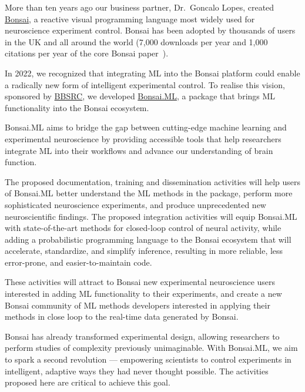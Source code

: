 More than ten years ago our business partner, Dr.~Goncalo Lopes, created
\href{https://bonsai-rx.org/}{Bonsai}, a reactive visual programming
language most widely used for neuroscience experiment control.
%
Bonsai has been adopted by thousands of users in the UK and all around the
world (7,000 downloads per year and 1,000 citations per year of the core Bonsai
paper~\citep{lopesEtAl15}).

In 2022, we recognized that integrating ML into the Bonsai platform could
enable a radically new form of intelligent experimental control.
%
To realise this vision, sponsored by
\href{https://gow.bbsrc.ukri.org/grants/AwardDetails.aspx?FundingReference=BB\%2FW019132\%2F1}{BBSRC},
we developed \href{https://bonsai-rx.org/machinelearning}{Bonsai.ML}, a package
that brings ML functionality into the Bonsai ecosystem.

Bonsai.ML aims to bridge the gap between cutting-edge machine learning and
experimental neuroscience by providing accessible tools that help researchers
integrate ML into their workflows and advance our understanding of brain
function.

The proposed documentation, training and dissemination activities will help
users of Bonsai.ML better understand the ML methods in the package, perform
more sophisticated neuroscience experiments, and produce unprecedented new
neuroscientific findings.
%
The proposed integration activities will equip Bonsai.ML with state-of-the-art
methods for closed-loop control of neural activity, while adding a
probabilistic programming language to the Bonsai ecosystem that will
accelerate, standardize, and simplify inference, resulting in more reliable,
less error-prone, and easier-to-maintain code.

These activities will attract to Bonsai new experimental neuroscience users
interested in adding ML functionality to their experiments, and create a new
Bonsai community of ML methods developers interested in applying their methods
in close loop to the real-time data generated by Bonsai.

Bonsai has already transformed experimental design, allowing researchers to
perform studies of complexity previously unimaginable. With Bonsai.ML, we aim
to spark a second revolution — empowering scientists to control experiments in
intelligent, adaptive ways they had never thought possible. The activities
proposed here are critical to achieve this goal.

